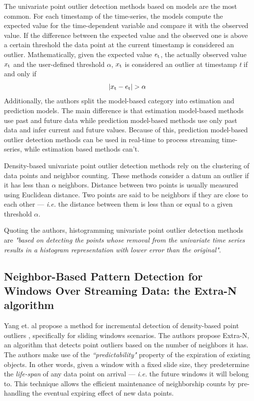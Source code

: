 The univariate point outlier detection methods based on models are the most common. For each timestamp of the time-series, the models compute the expected value for the time-dependent variable and compare it with the observed value. If the difference between the expected value and the observed one is above a certain threshold the data point at the current timestamp is considered an outlier. Mathematically, given the expected value $e\textsubscript{t}$, the actually observed value $x\textsubscript{t}$ and the user-defined threshold $\alpha$, $x\textsubscript{t}$ is considered an outlier at timestamp \textit{t} if and only if
\begin{equation*}
    |x\textsubscript{t}-e\textsubscript{t}|>\alpha
\end{equation*}
Additionally, the authors split the model-based category into estimation and prediction models. The main difference is that estimation model-based methods use past and future data while prediction model-based methods use only past data and infer current and future values. Because of this, prediction model-based outlier detection methods can be used in real-time to process streaming time-series, while estimation based methods can't.

Density-based univariate point outlier detection methods rely on the clustering of data points and neighbor counting. These methods consider a datum an outlier if it has less than $\alpha$ neighbors. Distance between two points is usually measured using Euclidean distance. Two points are said to be neighbors if they are close to each other --- \textit{i.e.} the distance between them is less than or equal to a given threshold $\alpha$.

Quoting the authors, histogramming univariate point outlier detection methods are \textit{"based on detecting the points whose removal from the univariate time series results in a histogram representation with lower error than the original"}.


\subsection{Neighbor-Based Pattern Detection for Windows Over Streaming Data: the Extra-N algorithm}

Yang et. al propose a method for incremental detection of density-based point outliers \cite{Yang-Neighbor-Based-Pattern-Detection}, specifically for sliding windows scenarios. The authors propose Extra-N, an algorithm that detects point outliers based on the number of neighbors it has. The authors make use of the \textit{“predictability"} property of the expiration of existing objects. In other words, given a window with a fixed slide size, they predetermine the \textit{life-span} of any data point on arrival --- \textit{i.e.} the future windows it will belong to. This technique allows the efficient maintenance of neighborship counts by pre-handling the eventual expiring effect of new data points.

